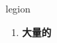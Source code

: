 
\begin{frame}
{\huge legion}
\begin{center}
\begin{enumerate}\Large
  \item \textbf{大量的}
\end{enumerate}
\end{center}
\end{frame}

